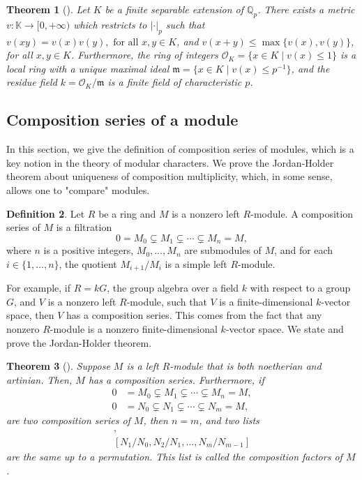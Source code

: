 \documentclass[12pt,a4paper]{report}
\newtheorem{theorem}{Theorem}[chapter]
\theoremstyle{definition}
\newtheorem{definition}[theorem]{Definition}
\theoremstyle{remark}
\theoremstyle{definition}
\begin{document}
\begin{theorem}[{\cite[Chapter 2, Section 5]{neukirch_algebraic_2013}}]\label{thm: local_fields}
Let $K$ be a finite separable extension of $\mathbb{Q}_p$. There exists a metric $v: \mathbb{K}\to [0, +\infty)$ which restricts to $|\cdot |_p$ such that $v(xy) = v(x)v(y), \text{ for all } x, y\in K$, and $ v(x+y)\leq \max\{v(x), v(y)\}$, for all $x, y\in K$. Furthermore, the ring of integers $\mathcal{O}_K = \{x\in K\mid v(x)\leq 1\}$ is a local ring with a unique maximal ideal $\mathfrak{m} = \{x\in K\mid v(x)\leq p^{-1}\}$, and the residue field $k = \mathcal{O}_K/\mathfrak{m}$ is a finite field of characteristic $p$. 
\end{theorem}
\subsection{Composition series of a module}
In this section, we give the definition of composition series of modules, which is a key notion in the theory of modular characters. We prove the Jordan-Holder theorem about uniqueness of composition multiplicity, which, in some sense, allows one to "compare" modules.
\begin{definition}\label{def: composition_series}
Let $R$ be a ring and $M$ is a nonzero left $R$-module. A composition series of $M$ is a filtration 
\begin{equation*}
    0 = M_0 \subsetneq M_1\subsetneq \cdots \subsetneq M_n = M,
\end{equation*}
where $n$ is a positive integers, $M_0, \ldots, M_n$ are submodules of $M$, and for each $i\in \{1, \ldots, n\}$, the quotient $M_{i+1}/M_i$ is a simple left $R$-module.
\end{definition}
For example, if $R = kG$, the group algebra over a field $k$ with respect to a group $G$, and $V$ is a nonzero left $R$-module, such that $V$ is a finite-dimensional $k$-vector space, then $V$ has a composition series. This comes from the fact that any nonzero $R$-module is a nonzero finite-dimensional $k$-vector space.\smallbreak
We state and prove the Jordan-Holder theorem.
\begin{theorem}[{\cite[Theorem 3]{mahmoudi_jordan-holder_2012}}]\label{thm: Jordan-Holder}
Suppose $M$ is a left $R$-module that is both noetherian and artinian. Then, $M$ has a composition series. Furthermore, if
\begin{align*}
    0 &= M_0 \subsetneq M_1\subsetneq \cdots \subsetneq M_n = M,\\
    0 &= N_0 \subsetneq N_1\subsetneq \cdots \subsetneq N_m = M,
\end{align*}
are two composition series of $M$, then $n = m$, and two lists 
\begin{align*}
 [M_1/M_0, M_2/M_1, \ldots, M_n/M_{n-1}],\\   
[N_1/N_0, N_2/N_1, \ldots, N_m/N_{m-1}]
\end{align*}
are the same up to a permutation. \smallbreak
This list is called the composition factors of $M$.
\end{theorem}
\end{document}
